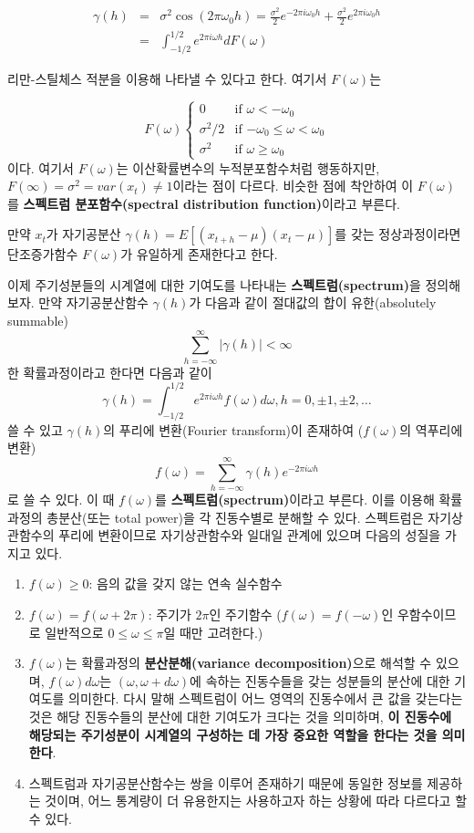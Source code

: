\documentclass[b5paper,]{scrbook}
\theoremstyle{plain}
\theoremstyle{definition}
\numberwithin{equation}{section}
\begin{document}
\begin{eqnarray*}
\gamma(h)&=&\sigma^{2}\cos (2\pi \omega_{0}h)=\frac{\sigma^{2}}{2}e^{-2\pi i \omega_{0}h}+\frac{\sigma^{2}}{2}e^{2\pi i \omega_{0}h}\\
&=&\int_{-1/2}^{1/2}e^{2\pi i \omega h }dF(\omega)
\end{eqnarray*}

리만-스틸체스 적분을 이용해 나타낼 수 있다고 한다. 여기서
\(F(\omega)\)는

\[
F(\omega) 
\begin{cases}
0 & \text{if $\omega < -\omega_{0}$}\\
\sigma^{2}/2 & \text{if $-\omega_{0} \leq \omega < \omega_{0}$}\\
\sigma^{2} & \text{if $\omega \geq \omega_{0}$}
\end{cases}
\] 이다. 여기서 \(F(\omega)\)는 이산확률변수의 누적분포함수처럼
행동하지만, \(F(\infty)=\sigma^{2}=var(x_{t})\neq 1\)이라는 점이 다르다.
비슷한 점에 착안하여 이 \(F(\omega)\)를 \textbf{스펙트럼
분포함수(spectral distribution function)}이라고 부른다.

만약 \(x_{t}\)가 자기공분산 \(\gamma(h)=E[(x_{t+h}-\mu)(x_{t}-\mu)]\)를
갖는 정상과정이라면 단조증가함수 \(F(\omega)\)가 유일하게 존재한다고
한다.

이제 주기성분들의 시계열에 대한 기여도를 나타내는
\textbf{스펙트럼(spectrum)}을 정의해보자. 만약 자기공분산함수
\(\gamma(h)\)가 다음과 같이 절대값의 합이 유한(absolutely summable)
\[\sum_{h=-\infty}^{\infty}|\gamma(h)|<\infty\] 한 확률과정이라고 한다면
다음과 같이
\[\gamma(h)=\int_{-1/2}^{1/2}e^{2\pi i \omega h }f(\omega)d\omega, h=0,\pm 1, \pm 2,\ldots\]
쓸 수 있고 \(\gamma(h)\)의 푸리에 변환(Fourier transform)이 존재하여
(\(f(\omega)\)의 역푸리에 변환)
\[f(\omega)=\sum_{h=-\infty}^{\infty}\gamma(h)e^{-2\pi i \omega h}\] 로
쓸 수 있다. 이 때 \(f(\omega)\)를 \textbf{스펙트럼(spectrum)}이라고
부른다. 이를 이용해 확률과정의 총분산(또는 total power)을 각 진동수별로
분해할 수 있다. 스펙트럼은 자기상관함수의 푸리에 변환이므로
자기상관함수와 일대일 관계에 있으며 다음의 성질을 가지고 있다.

\begin{enumerate}
\def\labelenumi{\arabic{enumi}.}
\item
  \(f(\omega)\geq 0\): 음의 값을 갖지 않는 연속 실수함수
\item
  \(f(\omega)=f(\omega + 2\pi)\): 주기가 \(2\pi\)인 주기함수
  (\(f(\omega)=f(-\omega)\)인 우함수이므로 일반적으로
  \(0\leq \omega \leq \pi\)일 때만 고려한다.)
\item
  \(f(\omega)\)는 확률과정의 \textbf{분산분해(variance
  decomposition)}으로 해석할 수 있으며, \(f(\omega)d\omega\)는
  \((\omega, \omega+d\omega)\)에 속하는 진동수들을 갖는 성분들의 분산에
  대한 기여도를 의미한다. 다시 말해 스펙트럼이 어느 영역의 진동수에서 큰
  값을 갖는다는 것은 해당 진동수들의 분산에 대한 기여도가 크다는 것을
  의미하며, \textbf{이 진동수에 해당되는 주기성분이 시계열의 구성하는 데
  가장 중요한 역할을 한다는 것을 의미한다}.
\item
  스펙트럼과 자기공분산함수는 쌍을 이루어 존재하기 때문에 동일한 정보를
  제공하는 것이며, 어느 통계량이 더 유용한지는 사용하고자 하는 상황에
  따라 다르다고 할 수 있다.
\end{enumerate}
\end{document}
